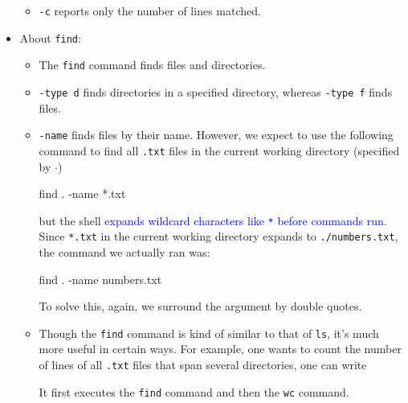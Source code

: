 \documentclass[UTF8]{book}
\newcommand{\code}[1]{\colorbox{codegray}{\texttt{#1}}}
\begin{document}
\begin{itemize}
\begin{itemize}
	\item \code{-c} reports only the number of lines matched.
\end{itemize}
\item About \code{find}:
\begin{itemize}
	\item The \code{find} command finds files and directories.
	\item \code{-type d} finds directories in a specified directory, whereas \code{-type f} finds files.
	\item \code{-name} finds files by their name. However, we expect to use the following command to find all \code{.txt} files in the current working directory (specified by \code{$\cdot$})
	\begin{bash}
find . -name *.txt
	\end{bash}
	but the shell \textcolor{blue}{expands wildcard characters like \code{*} before commands run}. Since \code{*.txt} in the current working directory expands to \code{./numbers.txt}, the command we actually ran was:
	\begin{bash}
find . -name numbers.txt
	\end{bash}
	To solve this, again, we surround the argument by double quotes.
	\item Though the \code{find} command is kind of similar to that of \code{ls}, it's much more useful in certain ways. For example, one wants to count the number of lines of all \code{.txt} files that span several directories, one can write
	It first executes the \code{find} command and then the \code{wc} command.
\end{itemize}
\end{itemize}
\end{document}
